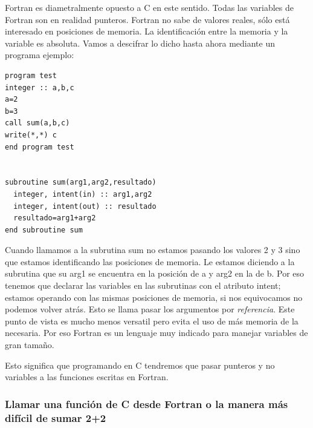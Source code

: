 Fortran es diametralmente opuesto a C en este sentido. Todas las
variables de Fortran son en realidad punteros. Fortran no sabe de
valores reales, sólo está interesado en posiciones de memoria. La
identificación entre la memoria y la variable es absoluta. Vamos a
descifrar lo dicho hasta ahora mediante un programa ejemplo:

\begin{verbatim}
program test
integer :: a,b,c
a=2
b=3
call sum(a,b,c)
write(*,*) c
end program test


subroutine sum(arg1,arg2,resultado)
  integer, intent(in) :: arg1,arg2
  integer, intent(out) :: resultado
  resultado=arg1+arg2
end subroutine sum
\end{verbatim}

Cuando llamamos a la subrutina sum no estamos pasando los valores 2 y
3 sino que estamos identificando las posiciones de memoria. Le estamos
diciendo a la subrutina que su arg1 se encuentra en la posición de a y
arg2 en la de b. Por eso tenemos que declarar las variables en las
subrutinas con el atributo intent; estamos operando con las mismas
posiciones de memoria, si nos equivocamos no podemos volver atrás.
Esto se llama pasar los argumentos por \emph{referencia}. Este punto
de vista es mucho menos versatil pero evita el uso de más memoria de
la necesaria. Por eso Fortran es un lenguaje muy indicado para manejar
variables de gran tamaño.

Esto significa que programando en C tendremos que pasar punteros y no
variables a las funciones escritas en Fortran.


\subsubsection{Llamar una función de C desde Fortran o la manera más difícil de sumar 2+2}

